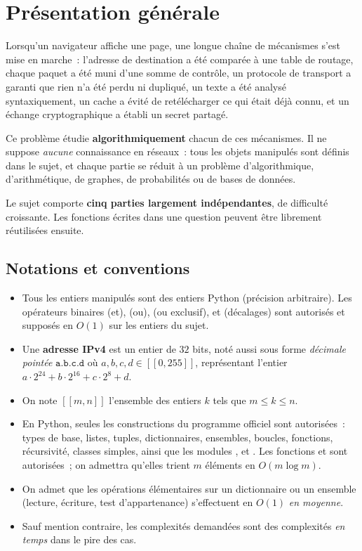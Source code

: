 \documentclass[11pt,a4paper]{article}
\begin{document}


\section*{Présentation générale}

Lorsqu'un navigateur affiche une page, une longue chaîne de mécanismes s'est mise en marche~:
l'adresse de destination a été comparée à une table de routage, chaque paquet a été muni
d'une somme de contrôle, un protocole de transport a garanti que rien n'a été perdu ni
dupliqué, un texte a été analysé syntaxiquement, un cache a évité de retélécharger ce qui
était déjà connu, et un échange cryptographique a établi un secret partagé.

Ce problème étudie \textbf{algorithmiquement} chacun de ces mécanismes. Il ne suppose
\emph{aucune} connaissance en réseaux~: tous les objets manipulés sont définis dans le
sujet, et chaque partie se réduit à un problème d'algorithmique, d'arithmétique, de graphes,
de probabilités ou de bases de données.

Le sujet comporte \textbf{cinq parties largement indépendantes}, de difficulté croissante.
Les fonctions écrites dans une question peuvent être librement réutilisées ensuite.

\subsection*{Notations et conventions}

\begin{itemize}[leftmargin=1.4em,itemsep=2pt]
\item Tous les entiers manipulés sont des entiers Python (précision arbitraire). Les
opérateurs binaires \code{&} (et), \code{|} (ou), \code{^} (ou exclusif), \code{<<} et
\code{>>} (décalages) sont autorisés et supposés en $O(1)$ sur les entiers du sujet.
\item Une \textbf{adresse IPv4} est un entier de $32$ bits, noté aussi sous forme
\emph{décimale pointée} $\texttt{a.b.c.d}$ où $a,b,c,d\in[\![0,255]\!]$, représentant
l'entier $a\cdot 2^{24}+b\cdot 2^{16}+c\cdot 2^{8}+d$.
\item On note $[\![m,n]\!]$ l'ensemble des entiers $k$ tels que $m\le k\le n$.
\item En Python, seules les constructions du programme officiel sont autorisées~: types de
base, listes, tuples, dictionnaires, ensembles, boucles, fonctions, récursivité, classes
simples, ainsi que les modules ,  et . Les fonctions
 et  sont autorisées~; on admettra qu'elles trient $m$ éléments en
$O(m\log m)$.
\item On admet que les opérations élémentaires sur un dictionnaire ou un ensemble
(lecture, écriture, test d'appartenance) s'effectuent en $O(1)$ \emph{en moyenne}.
\item Sauf mention contraire, les complexités demandées sont des complexités \emph{en
temps} dans le pire des cas.
\end{itemize}
\end{document}
